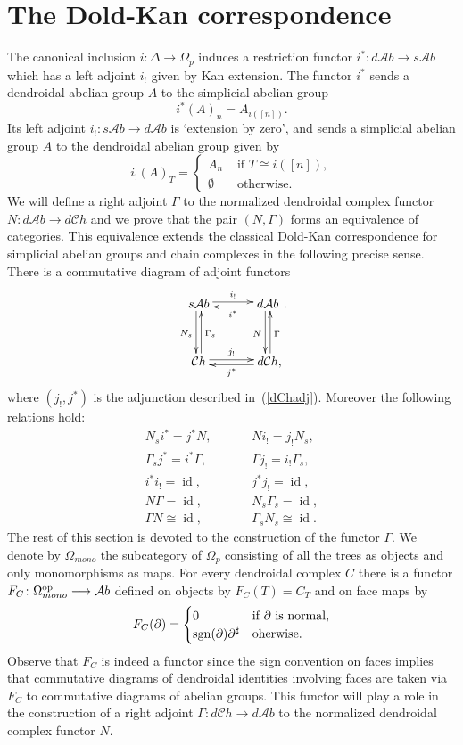 \documentclass[a4paper]{amsart}
\theoremstyle{plain}
\theoremstyle{definition}
\theoremstyle{remark}
\DeclareMathOperator{\sgn}{sgn}
\DeclareMathOperator{\id}{id}
\newcommand{\rpd}{\Omega_p}
\newcommand{\To}{\longrightarrow}
\newcommand{\A}{\mathcal{A}b}
\newcommand{\Ch}{\mathcal{C}h}
\newcommand{\dCh}{d\mathcal{C}h}
\newcommand{\dAb}{d\mathcal{A}b}
\numberwithin{equation}{section}
\numberwithin{figure}{section}
\begin{document}
\section{The Dold-Kan correspondence}
The canonical inclusion $i\colon\Delta\longrightarrow \rpd$ induces a restriction functor $i^*\colon \dAb\longrightarrow s\A$
which has a left adjoint $i_!$ given by Kan extension. The functor $i^*$ sends
a dendroidal abelian group $A$ to the simplicial abelian group
$$
i^*(A)_n = A_{i([n])}.
$$
Its left adjoint $i_!\colon s\A \longrightarrow \dAb$ is `extension
by zero', and sends a simplicial abelian group $A$ to the dendroidal
abelian group given by
$$
i_!(A)_T=\left\{
\begin{array}{cc}
A_n & \mbox{ if $T\cong i([n])$}, \\
\emptyset & \mbox{ otherwise}.
\end{array}
\right.
$$
We will define a right adjoint $\Gamma$ to the normalized dendroidal
complex functor $N\colon\dAb\longrightarrow \dCh$ and we prove that
the pair $(N,\Gamma)$ forms an equivalence of categories. This
equivalence extends the classical Dold-Kan correspondence for
simplicial abelian groups and chain complexes in the following precise sense. There is a
commutative diagram of adjoint functors
\[
\xymatrix@R+3mm@C+3mm{ s\A\ar@<2pt>[r]^-{i_!}\ar@<-2pt>[d]_{N_s} &\dAb\ar@<-2pt>[d]_N\ar@<2pt>[l]^-{i^*} \\
\Ch\ar@<2pt>[r]^-{j_!}\ar@<-2pt>[u]_{\Gamma_s}&\dCh{\rlap ,}\ar@<2pt>[l]^-{j^*}\ar@<-2pt>[u]_{\Gamma}}.
\]
where $(j_!, j^*)$ is the adjunction described in~(\ref{dChadj}). Moreover the following relations hold:
\[
\begin{array}{ccccccc}
N_s i^*=j^*N, &&&& Ni_!=j_!N_s,\\
\Gamma_s j^*=i^*\Gamma, &&&& \Gamma j_!=i_!\Gamma_s,\\
i^*i_!=\id, &&&& j^*j_!=\id, \\
N\Gamma=\id, &&&& N_s\Gamma_s=\id,\\
\Gamma N \cong \id, &&&& \Gamma_s N_s\cong \id.
\end{array}
\]
The rest of this section is devoted to the construction of the
functor $\Gamma$. We denote by $\Omega_{mono}$ the subcategory of
$\rpd$ consisting of all the trees as objects and only monomorphisms
as maps. For every dendroidal complex $C$ there is a functor
$F_C\colon \Omega_{mono}^{\rm op}\To\A$ defined on objects by
$F_C(T)=C_T$ and on face maps by
\[
F_C(\partial)=
\begin{cases}
0 & \textnormal{if $\partial$ is normal,}\\
\sgn(\partial)\partial^\sharp & \textnormal{oherwise.}
\end{cases}
\]
Observe that $F_C$ is indeed a functor since the sign convention on
faces implies that commutative diagrams of dendroidal identities
involving faces are taken via $F_C$ to commutative diagrams of
abelian groups. This functor will play a role in the construction of
a right adjoint $\Gamma\colon \dCh\To \dAb$ to the normalized
dendroidal complex functor $N$.
\end{document}
